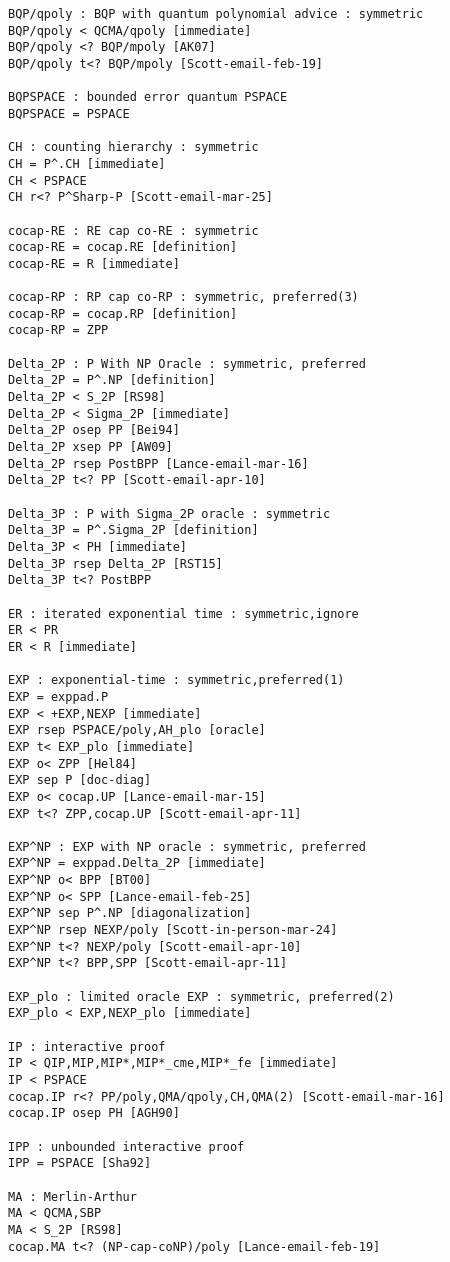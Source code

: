 \begin{verbatim}
BQP/qpoly : BQP with quantum polynomial advice : symmetric
BQP/qpoly < QCMA/qpoly [immediate]
BQP/qpoly <? BQP/mpoly [AK07]
BQP/qpoly t<? BQP/mpoly [Scott-email-feb-19]

BQPSPACE : bounded error quantum PSPACE
BQPSPACE = PSPACE

CH : counting hierarchy : symmetric
CH = P^.CH [immediate]
CH < PSPACE
CH r<? P^Sharp-P [Scott-email-mar-25]

cocap-RE : RE cap co-RE : symmetric
cocap-RE = cocap.RE [definition]
cocap-RE = R [immediate]

cocap-RP : RP cap co-RP : symmetric, preferred(3)
cocap-RP = cocap.RP [definition]
cocap-RP = ZPP

Delta_2P : P With NP Oracle : symmetric, preferred
Delta_2P = P^.NP [definition]
Delta_2P < S_2P [RS98]
Delta_2P < Sigma_2P [immediate]
Delta_2P osep PP [Bei94]
Delta_2P xsep PP [AW09]
Delta_2P rsep PostBPP [Lance-email-mar-16]
Delta_2P t<? PP [Scott-email-apr-10]

Delta_3P : P with Sigma_2P oracle : symmetric
Delta_3P = P^.Sigma_2P [definition]
Delta_3P < PH [immediate]
Delta_3P rsep Delta_2P [RST15]
Delta_3P t<? PostBPP

ER : iterated exponential time : symmetric,ignore
ER < PR
ER < R [immediate]

EXP : exponential-time : symmetric,preferred(1)
EXP = exppad.P
EXP < +EXP,NEXP [immediate]
EXP rsep PSPACE/poly,AH_plo [oracle]
EXP t< EXP_plo [immediate]
EXP o< ZPP [Hel84]
EXP sep P [doc-diag]
EXP o< cocap.UP [Lance-email-mar-15]
EXP t<? ZPP,cocap.UP [Scott-email-apr-11]

EXP^NP : EXP with NP oracle : symmetric, preferred
EXP^NP = exppad.Delta_2P [immediate]
EXP^NP o< BPP [BT00]
EXP^NP o< SPP [Lance-email-feb-25]
EXP^NP sep P^.NP [diagonalization]
EXP^NP rsep NEXP/poly [Scott-in-person-mar-24]
EXP^NP t<? NEXP/poly [Scott-email-apr-10]
EXP^NP t<? BPP,SPP [Scott-email-apr-11]

EXP_plo : limited oracle EXP : symmetric, preferred(2)
EXP_plo < EXP,NEXP_plo [immediate]

IP : interactive proof
IP < QIP,MIP,MIP*,MIP*_cme,MIP*_fe [immediate]
IP < PSPACE
cocap.IP r<? PP/poly,QMA/qpoly,CH,QMA(2) [Scott-email-mar-16]
cocap.IP osep PH [AGH90]

IPP : unbounded interactive proof
IPP = PSPACE [Sha92]

MA : Merlin-Arthur
MA < QCMA,SBP
MA < S_2P [RS98]
cocap.MA t<? (NP-cap-coNP)/poly [Lance-email-feb-19]


\end{verbatim}
